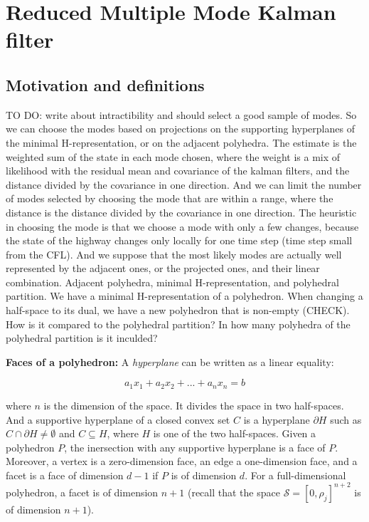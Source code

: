 \section{Reduced Multiple Mode Kalman filter}

\subsection{Motivation and definitions}

TO DO: write about intractibility and should select a good sample of modes. So we can choose the modes based on projections on the supporting hyperplanes of the minimal H-representation, or on the adjacent polyhedra. The estimate is the weighted sum of the state in each mode chosen, where the weight is a mix of likelihood with the residual mean and covariance of the kalman filters, and the distance divided by the covariance in one direction. And we can limit the number of modes selected by choosing the mode that are within a range, where the distance is the distance divided by the covariance in one direction. The heuristic in choosing the mode is that we choose a mode with only a few changes, because the state of the highway changes only locally for one time step (time step small from the CFL). And we suppose that the most likely modes are actually well represented by the adjacent ones, or the projected ones, and their linear combination. Adjacent polyhedra, minimal H-representation, and polyhedral partition. We have a minimal H-representation of a polyhedron. When changing a half-space to its dual, we have a new polyhedron that is non-empty (CHECK). How is it compared to the polyhedral partition? In how many polyhedra of the polyhedral partition is it inculded?

\hspace{10mm}

\noindent \textbf{Faces of a polyhedron: }A \textit{hyperplane} can be written as a linear equality:

\begin{equation}
a_{1}x_{1} + a_{2}x_{2} + ... + a_{n}x_{n} = b
\label{eq:hyperplane}
\end{equation}

\noindent where $n$ is the dimension of the space. It divides the space in two half-spaces. And a supportive hyperplane of a closed convex set $C$ is a hyperplane $\partial H$ such as $C\cap\partial H\neq \emptyset$ and $C\subseteq H$, where $H$ is one  of the two half-spaces. Given a polyhedron $P$, the inersection with any supportive hyperplane is a face of $P$. Moreover, a vertex is a zero-dimension face, an edge a one-dimension face, and a facet is a face of dimension $d-1$ if $P$ is of dimension $d$. For a full-dimensional polyhedron, a facet is of dimension $n+1$ (recall that the space $\mathcal{S} = [0,\rho_{j}]^{n+2}$ is of dimension $n+1$).

